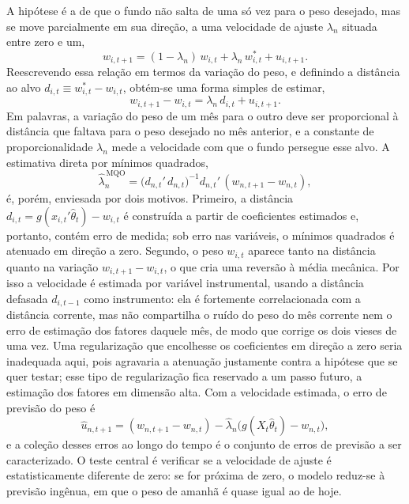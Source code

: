 \documentclass[12pt,a4paper]{article}
\begin{document}
A hipótese é a de que o fundo não salta de uma só vez para o peso desejado, mas se move
parcialmente em sua direção, a uma velocidade de ajuste $\lambda_n$ situada entre zero e um,
\begin{equation}
w_{i,t+1} = (1-\lambda_n)\,w_{i,t} + \lambda_n\,w^{*}_{i,t} + u_{i,t+1}.
\label{eq:pa1}
\end{equation}
Reescrevendo essa relação em termos da variação do peso, e definindo a distância ao alvo
$d_{i,t}\equiv w^{*}_{i,t}-w_{i,t}$, obtém-se uma forma simples de estimar,
\begin{equation}
w_{i,t+1}-w_{i,t} = \lambda_n\,d_{i,t} + u_{i,t+1}.
\label{eq:pa2}
\end{equation}
Em palavras, a variação do peso de um mês para o outro deve ser proporcional à distância que
faltava para o peso desejado no mês anterior, e a constante de proporcionalidade $\lambda_n$
mede a velocidade com que o fundo persegue esse alvo. A estimativa direta por mínimos quadrados,
\begin{equation}
\widehat{\lambda}^{\,\text{MQO}}_n = \big(d_{n,t}'\,d_{n,t}\big)^{-1} d_{n,t}'\,(w_{n,t+1}-w_{n,t}),
\label{eq:lambda}
\end{equation}
é, porém, enviesada por dois motivos. Primeiro, a distância
$d_{i,t}=g(x_{i,t}'\widehat{\theta}_t)-w_{i,t}$ é construída a partir de coeficientes estimados e,
portanto, contém erro de medida; sob erro nas variáveis, o mínimos quadrados é atenuado em
direção a zero. Segundo, o peso $w_{i,t}$ aparece tanto na distância quanto na variação
$w_{i,t+1}-w_{i,t}$, o que cria uma reversão à média mecânica. Por isso a velocidade é estimada
por variável instrumental, usando a distância defasada $d_{i,t-1}$ como instrumento: ela é
fortemente correlacionada com a distância corrente, mas não compartilha o ruído do peso do mês
corrente nem o erro de estimação dos fatores daquele mês, de modo que corrige os dois vieses de
uma vez. Uma regularização que encolhesse os coeficientes em direção a zero seria inadequada
aqui, pois agravaria a atenuação justamente contra a hipótese que se quer testar; esse tipo de
regularização fica reservado a um passo futuro, a estimação dos fatores em dimensão alta. Com a
velocidade estimada, o erro de previsão do peso é
\begin{equation}
\widehat{u}_{n,t+1} = (w_{n,t+1}-w_{n,t}) - \widehat{\lambda}_n\big(g(X_t\widehat{\theta}_t) - w_{n,t}\big),
\label{eq:u}
\end{equation}
e a coleção desses erros ao longo do tempo é o conjunto de erros de previsão a ser caracterizado.
O teste central é verificar se a velocidade de ajuste é estatisticamente diferente de zero: se
for próxima de zero, o modelo reduz-se à previsão ingênua, em que o peso de amanhã é quase igual
ao de hoje.
\end{document}
